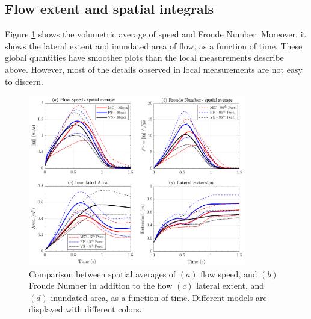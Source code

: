 \documentclass{article}
\begin{document}
\subsection{Flow extent and spatial integrals}
Figure \ref{fig:Ramp-spatial} shows the volumetric average of speed and Froude Number. Moreover, it shows the lateral extent and inundated area of flow, as a function of time. These global quantities have smoother plots than the local measurements describe above. However, most of the details observed in local measurements are not easy to discern.
\begin{figure}[H]
        \centering
        \includegraphics[width=0.85\textwidth]{InclinedPlane/AveragedMeasurments/Averaged_MeasuresIncline.png}
        \caption{Comparison between spatial averages of $(a)$ flow speed, and $(b)$ Froude Number in addition to the flow $(c)$ lateral extent, and $(d)$ inundated area, as a function of time. Different models are displayed with different colors.}
        \label{fig:Ramp-spatial}
\end{figure}
\end{document}
